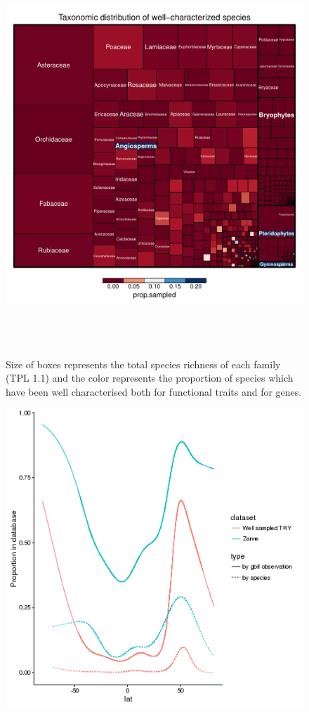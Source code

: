 \documentclass[a4paper,11pt]{article}
\begin{document}
\begin{figure}[h!]
\centering
  \includegraphics[width=15cm,height=15cm,keepaspectratio]{figures/treemap_well_known.pdf}
  \caption{Size of boxes represents the total species richness of each family (TPL 1.1) and the color represents the proportion of species which have been 
  well characterised both for functional traits and for genes.}
\end{figure}

\begin{figure}[h!]
\centering
  \includegraphics[width=\textwidth]{figures/multi_gam_zae_diaz.png}
  \label{fig:zanne_diaz_gam}
\end{figure}
\end{document}
